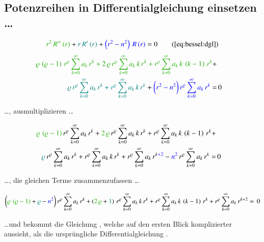 \subsection[Potenzreihen in Differentialgleichung \refeq{eq:bessel:dgl} einsetzen]{Potenzreihen in Differentialgleichung  einsetzen \dots}
\begin{align*}
	\textcolor{mygreen}{r^2 \, R'' \left( r \right)}
	+
	\textcolor{teal}{r \, R' \left( r \right)}
	+
	\textcolor{blue}{\left( r^2 - n^2 \right) \, R \left( r \right)}
	=
	0
	\tag{\ref{eq:bessel:dgl}}
\end{align*}
\begin{align*}	
	\textcolor{mygreen}{
		\varrho \, \left( \varrho - 1 \right) \, r^{\varrho}
		\sum_{k=0}^{\infty} a_k \, r^k
		+
		2 \, \varrho \, r^{\varrho}
		\sum_{k=0}^{\infty} a_k \, k \, r^k
		+
		r^{\varrho}
		\sum_{k=0}^{\infty} a_k \, k \, \left( k - 1 \right) \, r^k
	}
	+ \\
	\textcolor{teal}{
		\varrho \, r^{\varrho}
		\sum_{k=0}^{\infty} a_k \, r^k
		+
		r^{\varrho}
		\sum_{k=0}^{\infty} a_k \, k \, r^k
	}
	+ 
	\textcolor{blue}{
		\biggl(
		r^2 - n^2
		\biggr) \,
		r^{\varrho}
		\sum_{k=0}^{\infty} a_k \, r^k
	}
	= & \, 0
\end{align*}
\begin{normalsize}
\dots , ausmultiplizieren \dots
\end{normalsize}
\begin{align*}
	\textcolor{mygreen}{	\varrho \, \left( \varrho - 1 \right)} 
	\, r^{\varrho}
	\sum_{k=0}^{\infty} a_k \, r^k
	+
	\textcolor{mygreen}{2 \, \varrho}
	\, r^{\varrho}
	\sum_{k=0}^{\infty} a_k \, k \, r^k
	+
	r^{\varrho}
	\sum_{k=0}^{\infty} a_k \, k \, \left( k - 1 \right) \, r^k
	+ \\
	\textcolor{teal}{\varrho}
	\, r^{\varrho}
	\sum_{k=0}^{\infty} a_k \, r^k
	+
	r^{\varrho}
	\sum_{k=0}^{\infty} a_k \, k \, r^k
	+
	r^{\varrho}
		\sum_{k=0}^{\infty} a_k \, r^{k \textcolor{blue}{+ 2}}
	-
	\textcolor{blue}{n^2}
	\, r^{\varrho}
	\sum_{k=0}^{\infty} a_k \, r^k
	= & \, 0
\end{align*}
\begin{normalsize}
\dots , die gleichen Terme zusammenzufassen \dots
\end{normalsize}
\begin{align}
	\biggl(
	\textcolor{mygreen}{\varrho \, \left( \varrho - 1 \right)}
	+ 
	\textcolor{teal}{\varrho}
	-
	\textcolor{blue}{n^2}
	\biggr)
	\, r^{\varrho}
	\sum_{k=0}^{\infty} a_k \, r^k
	+ 
	\left(	
	\textcolor{mygreen}{2 \, \varrho}
	+
	\textcolor{teal}{1}
	\right)
	\, r^{\varrho}
	\sum_{k=0}^{\infty} a_k \, k \, r^k
	+
	r^{\varrho}
	\sum_{k=0}^{\infty} a_k \, k \, \left( k - 1 \right) \, r^k
	+ 
	r^{\varrho}
	\sum_{k=0}^{\infty} a_k \, r^{k + 2}
	= \, 0
	\label{eq:bessel:potenzreihe:dgl:vereinfacht}
\end{align}
\begin{normalsize}
\dots und bekommt die Gleichung ,
welche auf den ersten Blick komplizierter aussieht,
als die urspr\"ungliche Differentialgleichung .
\end{normalsize}
